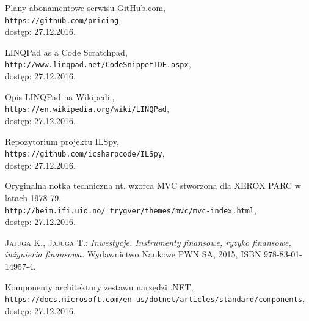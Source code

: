 \documentclass[a4paper,twoside,titlepage,openright]{book}
\begin{document}
\begin{thebibliography}{99}
 Plany abonamentowe serwisu GitHub.com, \\
\texttt{https://github.com/pricing}, \\dostęp: 27.12.2016.

 LINQPad as a Code Scratchpad, \\
\texttt{http://www.linqpad.net/CodeSnippetIDE.aspx}, \\dostęp: 27.12.2016.

 Opis LINQPad na Wikipedii, \\
\texttt{https://en.wikipedia.org/wiki/LINQPad}, \\dostęp: 27.12.2016.

 Repozytorium projektu ILSpy, \\
\texttt{https://github.com/icsharpcode/ILSpy}, \\dostęp: 27.12.2016.

 Oryginalna notka techniczna nt. wzorca MVC stworzona dla XEROX PARC w latach 1978-79, \\
\texttt{http://heim.ifi.uio.no/~trygver/themes/mvc/mvc-index.html}, \\dostęp: 27.12.2016.

 \textsc{Jajuga K., Jajuga T.:}
\textit{Inwestycje. Instrumenty finansowe, ryzyko finansowe, inżynieria finansowa.} Wydawnictwo Naukowe PWN SA, 2015, ISBN 978-83-01-14957-4.

 Komponenty architektury zestawu narzędzi .NET, \\
\texttt{https://docs.microsoft.com/en-us/dotnet/articles/standard/components}, \\dostęp: 27.12.2016.


\end{thebibliography}
\end{document}
